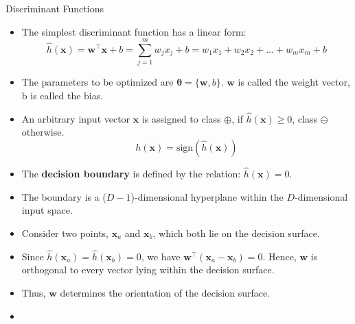 \begin{dwHeaderFrame}{Discriminant Functions}
	\begin{itemize}
		\item The simplest discriminant function has a linear form:
		\begin{equation}
			\widehat{h}(\bm{x}) = \bm{w}^{\intercal} \bm{x} + b = \sum_{j=1}^m w_j x_j + b = w_1 x_1 + w_2 x_2 + \dots + w_m x_m + b
		\end{equation}
		\item The parameters to be optimized are $\bm{\theta} = \{ \bm{w}, b \}$. $\bm{w}$ is called the weight vector, b is called the bias.
		\item An arbitrary input vector $\bm{x}$ is assigned to class $\oplus$, if $\widehat{h}(\bm{x}) \ge 0$, class $\ominus$ otherwise.
		\begin{equation}
			h(\bm{x}) = \text{sign}(\widehat{h}(\bm{x}))
		\end{equation}
		\item The \textbf{decision boundary} is defined by the relation: $\widehat{h}(\bm{x}) = 0$.
		\item The boundary is a ($D - 1$)-dimensional hyperplane within the $D$-dimensional input space.
	\end{itemize}
\end{dwHeaderFrame}


\begin{frame}
\end{frame}


\begin{frame}
	\begin{itemize}
		\item Consider two points, $\bm{x}_a$ and $\bm{x}_b$, which both lie on the decision surface.
		\item Since $\widehat{h}(\bm{x}_a) = \widehat{h}(\bm{x}_b) = 0$, we have $\bm{w}^{\intercal}(\bm{x}_a - \bm{x}_b) = 0$.
			Hence, $\bm{w}$ is orthogonal to every vector lying within the decision surface.
		\item Thus, $\bm{w}$ determines the orientation of the decision surface.
		\item 
	\end{itemize}
\end{frame}


